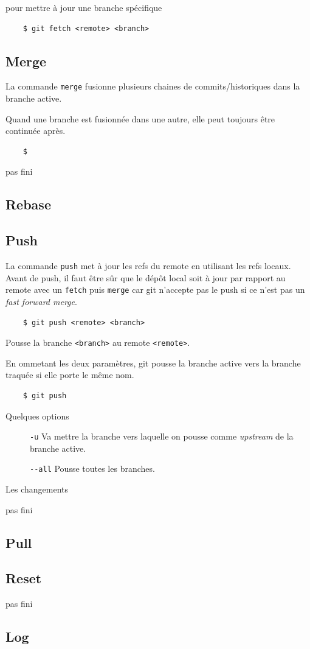\documentclass[a4paper, 12pt]{article}
\begin{document}
    pour mettre à jour une branche spécifique 
    \begin{lstlisting}
    $ git fetch <remote> <branch>
    \end{lstlisting}

    \subsection{Merge}
    La commande \lstinline{merge} fusionne plusieurs chaines de
    commits/historiques dans la branche active.

    Quand une branche est fusionnée dans une autre, elle peut toujours être
    continuée après.
    
    \begin{lstlisting}
    $ 
    \end{lstlisting}

    pas fini
    \subsection{Rebase}
    \subsection{Push}
    La commande \lstinline{push} met à jour les refs du remote en utilisant les
    refs locaux. Avant de push, il faut être sûr que le dépôt local soit à jour
    par rapport au remote avec un \lstinline{fetch} puis \lstinline{merge} car
    git n'accepte pas le push si ce n'est pas un \textit{fast forward merge}.

    \begin{lstlisting}
    $ git push <remote> <branch>
    \end{lstlisting}
     
    Pousse la branche \lstinline{<branch>} au remote \lstinline{<remote>}.

    En ommetant les deux paramètres, git pousse la branche active vers la
    branche traquée si elle porte le même nom.

    \begin{lstlisting}
    $ git push
    \end{lstlisting}

    Quelques options
    \begin{description}
        \item[] \lstinline{-u} Va mettre la branche vers laquelle on pousse
        comme \textit{upstream} de la branche active.
        \item[] \lstinline{--all} Pousse toutes les branches.
    \end{description}

    Les changements 

    pas fini
    \subsection{Pull}
    \subsection{Reset}
    pas fini
    \subsection{Log}
\end{document}
